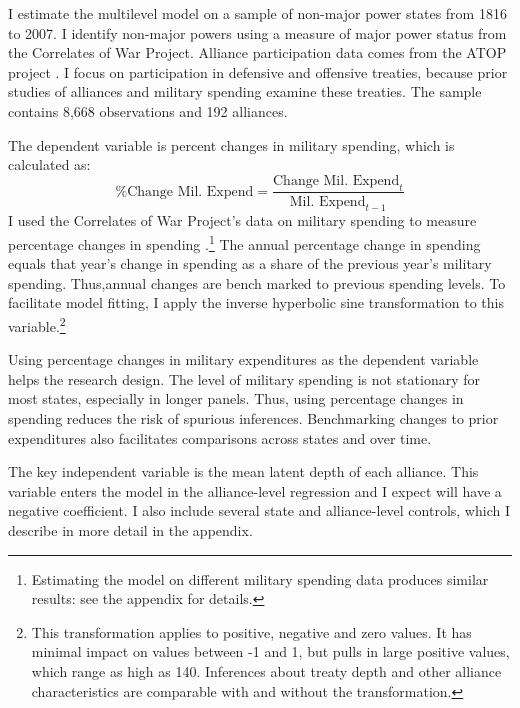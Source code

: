 \documentclass[12pt]{article}
\begin{document}
I estimate the multilevel model on a sample of non-major power states from 1816 to 2007. 
I identify non-major powers using a measure of major power status from the Correlates of War Project. 
Alliance participation data comes from the ATOP project \citep{Leedsetal2002}.  
I focus on participation in defensive and offensive treaties, because prior studies of alliances and military spending examine these treaties. 
The sample contains 8,668 observations and 192 alliances. 


The dependent variable is percent changes in military spending, which is calculated as:
\begin{equation}
\mbox{\% Change Mil. Expend} = \frac{ \mbox{Change Mil. Expend}_t }{ \mbox{Mil. Expend}_{t-1} }
\end{equation} 
I used the Correlates of War Project's data on military spending to measure percentage changes in spending \citep{SingerCINC1988}.\footnote{Estimating the model on different military spending data produces similar results: see the appendix for details.} 
The annual percentage change in spending equals that year's change in spending as a share of the previous year's military spending.
Thus,annual changes are bench marked to previous spending levels. 
To facilitate model fitting, I apply the inverse hyperbolic sine transformation to this variable.\footnote{This transformation applies to positive, negative and zero values. It has minimal impact on values between -1 and 1, but pulls in large positive values, which range as high as 140. Inferences about treaty depth and other alliance characteristics are comparable with and without the transformation.}


Using percentage changes in military expenditures as the dependent variable helps the research design. 
The level of military spending is not stationary for most states, especially in longer panels. 
Thus, using percentage changes in spending reduces the risk of spurious inferences.
Benchmarking changes to prior expenditures also facilitates comparisons across states and over time. 


The key independent variable is the mean latent depth of each alliance. 
This variable enters the model in the alliance-level regression and I expect will have a negative coefficient. 
I also include several state and alliance-level controls, which I describe in more detail in the appendix. 
\end{document}
